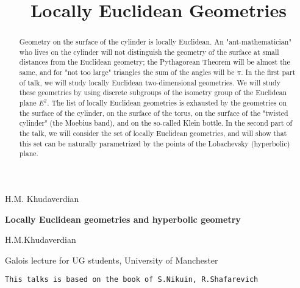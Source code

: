 \documentclass[12pt]{article}
\title{Locally Euclidean Geometries}
\date{}
\theoremstyle{definition}
\numberwithin{equation}{section}
\begin{document}
\maketitle

 \centerline {H.M. Khudaverdian}



\def\vare {\varepsilon}
\def\AA {{\bf A}}
\def\A {{\cal A}}
\def\t {\tilde}
\def\bs {{\bf s}}
\def\a {\alpha}
\def\d {\delta}
\def\K {{\bf K}}
\def\N {{\bf N}}
\def\w {\omega}
\def\s {{\sigma}}
\def\S {{\Sigma}}
\def\s {{\sigma}}
\def\p{\partial}
\def\vare{{\varepsilon}}
\def\Q {{\bf Q}}
\def\D {{\cal D}}
\def\B {{\cal B}}
\def\G {{\Gamma}}
\def\C {{\bf C}}
\def\R {{\bf R}}
\def\L {{\cal L}}
\def\F {{\cal F}}
\def\Z {{\bf Z}}
\def\U  {{\cal U}}
\def\H {{\bf H}}
\def\S  {{\bf S}}
\def\E  {{\bf E}}
\def\l {\lambda}
\def\degree {{\bf {\rm degree}\,\,}}
\def \finish {${\,\,\vrule height1mm depth2mm width 8pt}$}
\def \m {\medskip}
\def\p {\partial}
\def\r {{\bf r}}
\def\pt {{\bf pt}}
\def\v {{\bf v}}
\def\n {{\bf n}}
\def\t {{\bf t}}
\def\b {{\bf b}}
\def\c {{\bf c }}
\def\e{{\bf e}}
\def\ac {{\bf a}}
\def \X   {{\bf X}}
\def \Y   {{\bf Y}}
\def \x   {{\bf x}}
\def \y   {{\bf y}}
\def\ss  {\sigma_{\rm sph}}
\def \grad {{\rm grad\,}}
\def\e {{\bf e}}
\def\f {{\bf f}}
\def\g {{\bf g}}



  \centerline    {\bf Locally Euclidean geometries and 
       hyperbolic geometry}

  \centerline {H.M.Khudaverdian}

\centerline {Galois lecture for UG students, University of Manchester}



{\tt This talks is based on the book of S.Nikuin, R.Shafarevich}

\medskip

\begin{abstract}


Geometry on the surface of the cylinder is 
locally Euclidean. An "ant-mathematician" who lives 
on the cylinder will not  distinguish the geometry of  
the surface at small distances from the Euclidean  
geometry; the Pythagorean Theorem will be almost the same, 
and for "not too large" triangles the sum of the angles will
 be $\pi$.
      In the first part of talk, we will study locally 
Euclidean two-dimensional geometries. We will study  
these geometries by using discrete subgroups of the 
isometry group of the Euclidean 
plane $E^2$. The list of locally Euclidean geometries is 
exhausted by the geometries  on the surface of the cylinder, 
on the surface of the torus, on the surface of the 
"twisted cylinder" (the Moebius band), 
and on the so-called Klein bottle.
         In the second part of the talk, we will 
consider the set of locally Euclidean  geometries, 
and will show that this set can be naturally 
parametrized by the points of the Lobachevsky 
(hyperbolic) plane.


\end{abstract}
\end{document}
